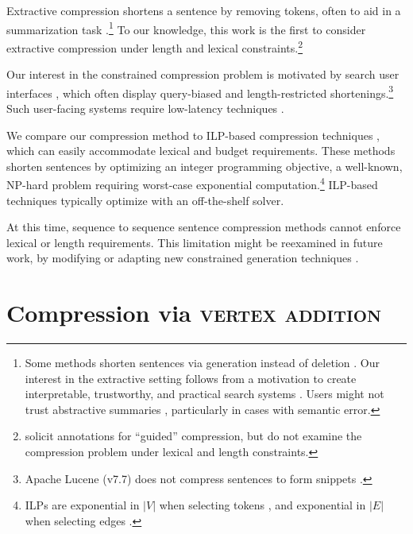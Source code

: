 \documentclass[11pt,a4paper]{article}
\begin{document}
Extractive compression \cite{Knight2000StatisticsBasedS,clarke2008global,filippova2015sentence,Wang2017CanSH} shortens a sentence by removing tokens, often to aid in a summarization task \cite{Knight2000StatisticsBasedS,almeida2013fast,P16-1188}.\footnote{Some methods shorten sentences via generation instead of deletion \cite{rush2015neural,mallinson18}. Our interest in the extractive setting follows from a motivation to create interpretable,  trustworthy, and practical search systems \cite{Chuang2012InterpretationAT}. Users might not trust abstractive summaries \cite{Zhang:2018:MSG:3290265.3274465}, particularly in cases with semantic error.} To our knowledge, this work is the first to consider extractive compression under length and lexical constraints.\footnote{\citet{Li2013DocumentSV} solicit annotations for ``guided'' compression, but do not examine the compression problem under lexical and length constraints.}

Our interest in the constrained compression problem is motivated by search user interfaces \cite{hearst2009search}, which often display query-biased \cite{tombros1998advantages} and length-restricted shortenings.\footnote{Apache Lucene {\small (v7.7)} does not compress sentences to form snippets \cite{lucene}.} 
Such user-facing systems require low-latency techniques \cite{Nielsen,heerschei,Liu2014TheEO}.

We compare our compression method to ILP-based compression techniques \cite{clarke2008global,filippova2008dependency,filippova2013overcoming,Wang2017CanSH}, which can easily accommodate lexical and budget requirements. These methods shorten sentences by optimizing an integer programming objective, a well-known, NP-hard problem \cite{clarke2008global} requiring worst-case exponential computation.\footnote{ILPs are exponential in $|V|$ when selecting tokens \cite{clarke2008global}, and exponential in $|E|$ when selecting edges \cite{filippova2013overcoming}.} ILP-based techniques typically optimize with an off-the-shelf solver. 

At this time, sequence to sequence sentence compression methods \cite{filippova2015sentence}  cannot enforce lexical or length requirements. This limitation might be reexamined in future work, by modifying or adapting new constrained generation techniques \cite{D16-1140,N18-1119,D18-1443,aaimh}.

\section{Compression via \textsc{vertex addition}}\label{s:system}
\end{document}
